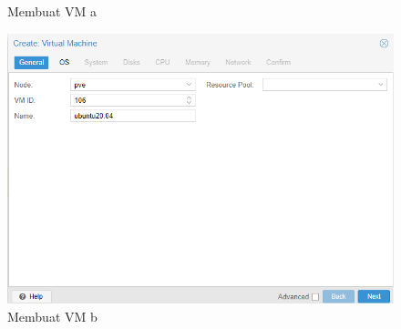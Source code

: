 \documentclass{article}
\begin{document}
\begin{enumerate}
\begin{figure}[h!]
    \caption{Membuat VM a}
  \end{figure}
  \begin{figure}[h!]
    \centering
    \includegraphics[width=0.7\linewidth]{create vm 2 b.png}
    \caption{Membuat VM b}
  \end{figure}
  \end{enumerate}
\end{document}
